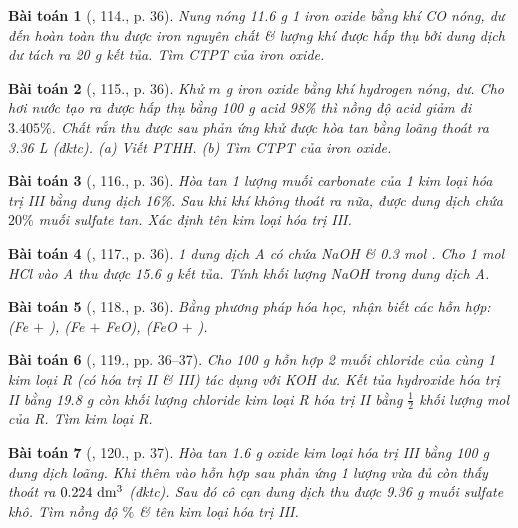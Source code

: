 \documentclass{article}
\newtheorem{baitoan}{Bài toán}
\begin{document}
\begin{baitoan}[\cite{An_400_BT_Hoa_Hoc_9}, 114., p. 36]
	Nung nóng {\rm11.6 g} 1 iron oxide bằng khí {\rm CO} nóng, dư đến hoàn toàn thu được iron nguyên chất \& lượng khí được hấp thụ bởi dung dịch {\rm{}} dư tách ra {\rm20 g} kết tủa. Tìm {\rm CTPT} của iron oxide.
\end{baitoan}

\begin{baitoan}[\cite{An_400_BT_Hoa_Hoc_9}, 115., p. 36]
	Khử $m$ {\rm g} iron oxide bằng khí hydrogen nóng, dư. Cho hơi nước tạo ra được hấp thụ bằng {\rm100 g} acid {\rm{} 98\%} thì nồng độ acid giảm đi $3.405\%$. Chất rắn thu được sau phản ứng khử được hòa tan bằng {\rm{}} loãng thoát ra {\rm3.36 L } (đktc). (a) Viết {\rm PTHH}. (b) Tìm {\rm CTPT} của iron oxide.
\end{baitoan}

\begin{baitoan}[\cite{An_400_BT_Hoa_Hoc_9}, 116., p. 36]
	Hòa tan 1 lượng muối carbonate của 1 kim loại hóa trị III bằng dung dịch {\rm{} 16\%}. Sau khi khí không thoát ra nữa, được dung dịch chứa $20\%$ muối sulfate tan. Xác định tên kim loại hóa trị III.
\end{baitoan}

\begin{baitoan}[\cite{An_400_BT_Hoa_Hoc_9}, 117., p. 36]
	1 dung dịch A có chứa {\rm NaOH} \& {\rm0.3 mol }. Cho {\rm1 mol HCl} vào A thu được {\rm15.6 g} kết tủa. Tính khối lượng {\rm NaOH} trong dung dịch A.
\end{baitoan}

\begin{baitoan}[\cite{An_400_BT_Hoa_Hoc_9}, 118., p. 36]
	Bằng phương pháp hóa học, nhận biết các hỗn hợp: {\rm(Fe $+$ ), (Fe $+$ FeO), (FeO $+$ }).
\end{baitoan}

\begin{baitoan}[\cite{An_400_BT_Hoa_Hoc_9}, 119., pp. 36--37]
	Cho {\rm100 g} hỗn hợp 2 muối chloride của cùng 1 kim loại R (có hóa trị II \& III) tác dụng với {\rm KOH} dư. Kết tủa hydroxide hóa trị II bằng {\rm19.8 g} còn khối lượng chloride kim loại R hóa trị II bằng $\frac{1}{2}$ khối lượng mol của R. Tìm kim loại R.
\end{baitoan}

\begin{baitoan}[\cite{An_400_BT_Hoa_Hoc_9}, 120., p. 37]
	Hòa tan {\rm1.6 g} oxide kim loại hóa trị III bằng {\rm100 g} dung dịch {\rm{}} loãng. Khi thêm vào hỗn hợp sau phản ứng 1 lượng {\rm{}} vừa đủ còn thấy thoát ra $\rm0.224\ dm^3$ {\rm{}} (đktc). Sau đó cô cạn dung dịch thu được {\rm9.36 g} muối sulfate khô. Tìm nồng độ $\%$ {\rm{}} \& tên kim loại hóa trị III.
\end{baitoan}
\end{document}
